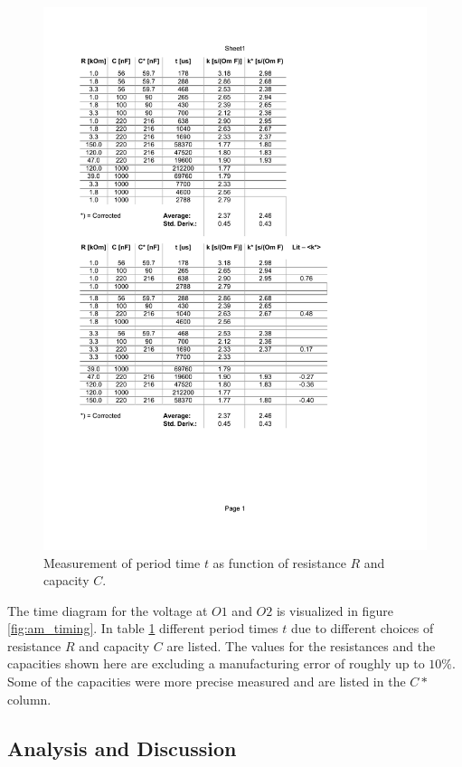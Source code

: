 \documentclass[journal]{IEEEtran}
\begin{document}
\begin{figure}
  \centering
   \includegraphics[trim=20mm 63mm 55mm 130mm, clip,
   width=\columnwidth]{results/am_data.pdf}
   \caption{Measurement of period time $t$ as function of resistance $R$ and
   capacity $C$.}
   \label{fig:am_result}
\end{figure}


The time diagram for the voltage at $O1$ and $O2$ is visualized in figure
\ref{fig:am_timing}. In table \ref{fig:am_result} different period times $t$ due 
to different choices of resistance $R$ and capacity $C$ are listed. The values
for the resistances and the capacities shown here are excluding a manufacturing
error of roughly up to $10\%$. Some of the capacities were more precise
measured and are listed in the $C*$ column.

\subsection{Analysis and Discussion}
\end{document}
